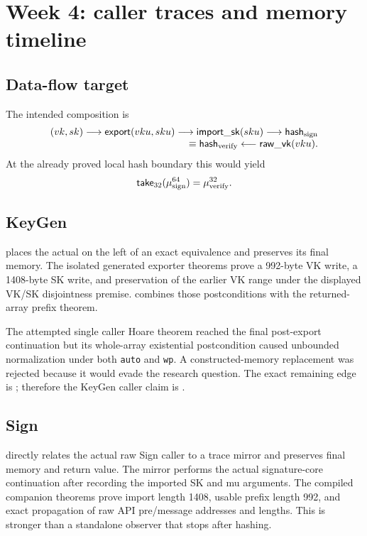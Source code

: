 \section{Week 4: caller traces and memory timeline}

\subsection{Data-flow target}

The intended composition is
\[
\begin{array}{c}
  (vk,sk)
  \longrightarrow \mathsf{export}(vku,sku)
  \longrightarrow \mathsf{import\_sk}(sku)
  \longrightarrow \mathsf{hash}_{\rm sign} \\
  \hfill \equiv \mathsf{hash}_{\rm verify}
  \longleftarrow \mathsf{raw\_vk}(vku).
\end{array}
\]
At the already proved local hash boundary this would yield
\[
  \mathsf{take}_{32}(\mu_{\rm sign}^{64})=\mu_{\rm verify}^{32}.
\]

\subsection{KeyGen}

 places the actual
 on the left of an exact
equivalence and preserves its final memory.  The isolated generated exporter
theorems prove a 992-byte VK write, a 1408-byte SK write, and preservation of
the earlier VK range under the displayed VK/SK disjointness premise.
combines those postconditions with the returned-array prefix theorem.

The attempted single caller Hoare theorem reached the final post-export
continuation but its whole-array existential postcondition caused unbounded
normalization under both \texttt{auto} and \texttt{wp}.  A constructed-memory
replacement was rejected because it would evade the research question.
The exact remaining edge is
; therefore the
KeyGen caller claim is .

\subsection{Sign}

 directly relates the actual raw Sign
caller to a trace mirror and preserves final memory and return value.  The
mirror performs the actual signature-core continuation after recording the
imported SK and mu arguments.  The compiled companion theorems prove import
length 1408, usable prefix length 992, and exact propagation of raw API
pre/message addresses and lengths.  This is stronger than a standalone
observer that stops after hashing.

